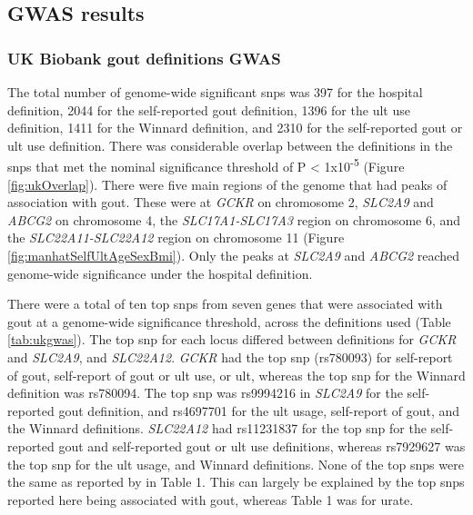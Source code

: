 \documentclass[]{report}
\begin{document}
\subsection{GWAS results}\label{gwasResults}

\subsubsection{UK Biobank gout definitions
GWAS}\label{uk-biobank-gout-definitions-gwas}

The total number of genome-wide significant \glspl{snp} was 397 for the
hospital definition, 2044 for the self-reported gout definition, 1396
for the \gls{ult} use definition, 1411 for the Winnard definition, and
2310 for the self-reported gout or \gls{ult} use definition. There was
considerable overlap between the definitions in the \glspl{snp} that met
the nominal significance threshold of P \textless{}
1x10\textsuperscript{-5} (Figure \ref{fig:ukOverlap}). There were five
main regions of the genome that had peaks of association with gout.
These were at \emph{GCKR} on chromosome 2, \emph{SLC2A9} and
\emph{ABCG2} on chromosome 4, the \emph{SLC17A1-SLC17A3} region on
chromosome 6, and the \emph{SLC22A11-SLC22A12} region on chromosome 11
(Figure \ref{fig:manhatSelfUltAgeSexBmi}). Only the peaks at
\emph{SLC2A9} and \emph{ABCG2} reached genome-wide significance under
the hospital definition.

There were a total of ten top \glspl{snp} from seven genes that were
associated with gout at a genome-wide significance threshold, across the
definitions used (Table \ref{tab:ukgwas}). The top \gls{snp} for each
locus differed between definitions for \emph{GCKR} and \emph{SLC2A9},
and \emph{SLC22A12}. \emph{GCKR} had the top \gls{snp} (rs780093) for
self-report of gout, self-report of gout or \gls{ult} use, or \gls{ult},
whereas the top \gls{snp} for the Winnard definition was rs780094. The
top \gls{snp} was rs9994216 in \emph{SLC2A9} for the self-reported gout
definition, and rs4697701 for the \gls{ult} usage, self-report of gout,
and the Winnard definitions. \emph{SLC22A12} had rs11231837 for the top
\gls{snp} for the self-reported gout and self-reported gout or \gls{ult}
use definitions, whereas rs7929627 was the top \gls{snp} for the
\gls{ult} usage, and Winnard definitions. None of the top \glspl{snp}
were the same as reported by \citet{Kottgen2013} in Table 1. This can
largely be explained by the top \glspl{snp} reported here being
associated with gout, whereas \citet{Kottgen2013} Table 1 was for urate.
\end{document}
